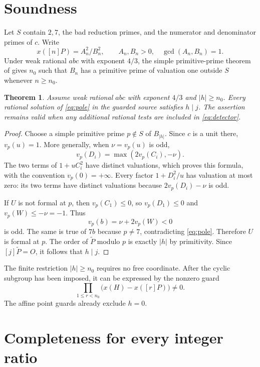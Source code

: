 \documentclass[11pt,a4paper]{article}
\newtheorem{theorem}{Theorem}[section]
\begin{document}
\section{Soundness}

Let $S$ contain $2,7$, the bad reduction primes, and the numerator
and denominator primes of $c$. Write
\[
       x([n]P)=A_n^2/B_n^2,
       \qquad A_n,B_n>0,\quad\gcd(A_n,B_n)=1.
\]
Under weak rational $abc$ with exponent $4/3$, the simple
primitive-prime theorem of \cite{Simple} gives $n_0$ such that
$B_n$ has a primitive prime of valuation one outside $S$ whenever
$n\ge n_0$.

\begin{theorem}\label{thm:sound}
Assume weak rational $abc$ with exponent $4/3$ and
$|h|\ge n_0$. Every rational solution of \eqref{eq:pole}
in the guarded source satisfies $h\mid j$. The assertion remains
valid when any additional rational tests are included in
\eqref{eq:detector}.
\end{theorem}
\begin{proof}
Choose a simple primitive prime $p\notin S$ of $B_{|h|}$.
Since $c$ is a unit there, $v_p(u)=1$.
More generally, when $\nu=v_p(u)$ is odd,
\[
                  v_p(D_i)=\max(2v_p(C_i),-\nu).
\]
The two terms of $1+uC_i^2$ have distinct valuations, which proves
this formula, with the convention $v_p(0)=+\infty$.
Every factor $1+D_i^2/u$ has valuation at most zero: its two terms
have distinct valuations because $2v_p(D_i)-\nu$ is odd.

If $U$ is not formal at $p$, then $v_p(C_1)\le0$, so
$v_p(D_1)\le0$ and $v_p(W)\le-\nu=-1$. Thus
\[
                  v_p(b)=\nu+2v_p(W)<0
\]
is odd. The same is true of $7b$ because $p\ne7$, contradicting
\eqref{eq:pole}. Therefore $U$ is formal at $p$.
The order of $\widetilde P$ modulo $p$ is exactly $|h|$ by
primitivity. Since $[j]\widetilde P=O$, it follows that $h\mid j$.
\end{proof}

The finite restriction $|h|\ge n_0$ requires no free coordinate.
After the cyclic subgroup has been imposed, it can be expressed by
the nonzero guard
\[
                 \prod_{1\le r<n_0}\bigl(x(H)-x([r]P)\bigr)\ne0.
\]
The affine point guards already exclude $h=0$.

\section{Completeness for every integer ratio}
\end{document}

